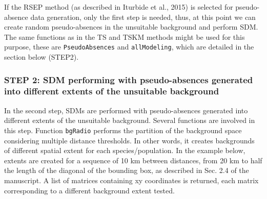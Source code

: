 \documentclass[10pt,a4paper]{article}
\begin{document}
If the RSEP method (as described in Iturbide et al., 2015) is selected for pseudo-absence data generation, only the first step is needed, thus, at this point we can create random pseudo-absences in the unsuitable background and perform SDM. The same functions as in the TS and TSKM methods might be used for this purpose, these are \texttt{PseudoAbsences} and \texttt{allModeling}, which are detailed in the section below (STEP2).

\begin{Schunk}
\end{Schunk}

\subsubsection{STEP 2: SDM performing with pseudo-absences generated into different extents of the unsuitable background}

In the second step, SDMs are performed with pseudo-absences generated into different extents of the unsuitable background. Several functions are involved in this step. Function \texttt{bgRadio} performs the partition of the background space considering multiple distance thresholds. In other words, it creates backgrounds of different spatial extent for each species/population. In the example below, extents are created for a sequence of 10 km between distances, from 20 km to half the length of the diagonal of the bounding box, as described in Sec. 2.4 of the manuscript. A list of matrices containing xy coordinates is returned, each matrix corresponding to a different background extent tested.
\end{document}
